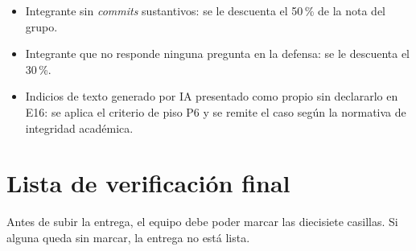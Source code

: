 \documentclass[11pt,a4paper]{article}
\begin{document}
\begin{itemize}[leftmargin=*,itemsep=3pt]
	\item Integrante sin \emph{commits} sustantivos: se le descuenta el 50\,\% de la nota del grupo.
	\item Integrante que no responde ninguna pregunta en la defensa: se le descuenta el 30\,\%.
	\item Indicios de texto generado por IA presentado como propio sin declararlo en E16: se aplica el criterio de piso P6 y se remite el caso según la normativa de integridad académica.
\end{itemize}

\section{Lista de verificación final}

Antes de subir la entrega, el equipo debe poder marcar las diecisiete casillas. Si alguna queda sin marcar, la entrega no está lista.
\end{document}
